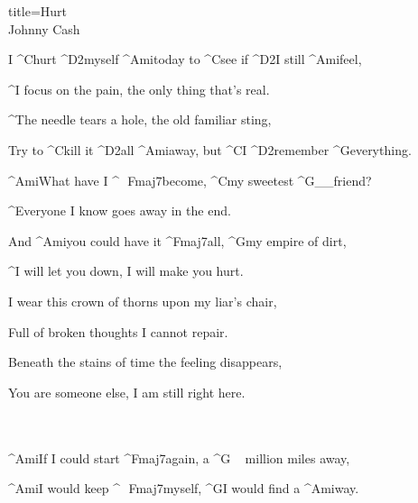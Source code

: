 \begin{song}{title=\predtitle\centering Hurt \\\large Johnny Cash \vspace*{-0.3cm}}  %
\begin{centerjustified}
\nejvetsi

\sloka 
	I ^{C}hurt ^{D2}myself ^{Ami}today to ^{C}see if ^{D2}I still ^{Ami}feel,

	^{\phantom{.}}I focus on the pain, the only thing that's real.
   	
   	^{\phantom{.}}The needle tears a hole, the old familiar sting,

	Try to ^{C}kill it ^{D2}all ^{Ami}away, but ^{C}I ^{D2}remember ^{G}everything.


	^{Ami}What have I ^{\,\,\,\,Fmaj7}become, ^{C}my sweetest ^{G{\color{white}\_\_}}friend?
	
	^{\phantom{.}}Everyone I know goes away in the end.

	And ^{Ami}you could have it ^{Fmaj7}all, ^{G}my empire of dirt,
	
	^{\phantom{.}}I will let you down, I will make you hurt.

\sloka   
	 I wear this crown of thorns upon my liar's chair,
   	
   	Full of broken thoughts I cannot repair.
   	
   	Beneath the stains of time the feeling disappears,
   	
   	You are someone else, I am still right here.


\\\\
   
	^{Ami}If I could start ^{Fmaj7}again, a ^{G\,\,\,\,\,\,\,}million miles away,

	^{Ami}I would keep ^{\,\,\,\,Fmaj7}myself, ^{G}I would find a ^{Ami}way.
	
\end{centerjustified}
\setcounter{Slokočet}{0}
\end{song}
